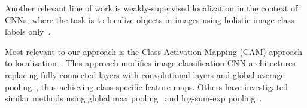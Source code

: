 

\noindent {}
Another relevant line of work is weakly-supervised localization in the context of CNNs, where the task is to localize objects in images using holistic image class labels only~\cite{cinbis2016weakly,oquab_cvpr14,oquab_cvpr15,zhou_cvpr16}.




Most relevant to our approach is the Class Activation Mapping (CAM) approach to localization~\cite{zhou_cvpr16}.
This approach modifies image classification CNN architectures replacing fully-connected layers with convolutional layers and global average pooling~\cite{lin2013network}, thus achieving class-specific feature maps. %
Others have investigated similar methods using global max pooling~\cite{oquab_cvpr15} and log-sum-exp pooling~\cite{pinheiro2015image}.


